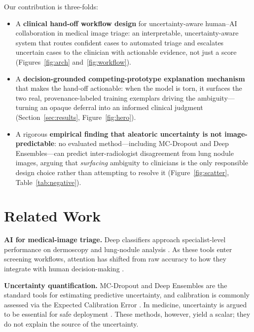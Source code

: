 \documentclass[10pt]{article}
\begin{document}
Our contribution is three-folds:
\begin{itemize}
\setlength\itemsep{0.1em}
\item A \textbf{clinical hand-off workflow design} for uncertainty-aware
human--AI collaboration in medical image triage: an interpretable,
uncertainty-aware system that routes confident cases to automated triage and
escalates uncertain cases to the clinician with actionable evidence, not just a
score (Figures~\ref{fig:arch} and~\ref{fig:workflow}).
\item A \textbf{decision-grounded competing-prototype explanation mechanism}
that makes the hand-off actionable: when the model is torn, it surfaces the two
real, provenance-labeled training exemplars driving the ambiguity---turning an
opaque deferral into an informed clinical judgment
(Section~\ref{sec:results}, Figure~\ref{fig:hero}).
\item A rigorous \textbf{empirical finding that aleatoric uncertainty is not
image-predictable}: no evaluated method---including MC-Dropout and Deep
Ensembles---can predict inter-radiologist disagreement from lung nodule images,
arguing that \emph{surfacing} ambiguity to clinicians is the only responsible
design choice rather than attempting to resolve it
(Figure~\ref{fig:scatter}, Table~\ref{tab:negative}).
\end{itemize}


\section{Related Work}

\textbf{AI for medical-image triage.} Deep classifiers approach specialist-level
performance on dermoscopy \parencite{esteva2017dermatologist,
tschandl2018ham10000} and lung-nodule analysis \parencite{armato2011lidc,
setio2017luna}. As these tools enter screening workflows, attention has shifted
from raw accuracy to how they integrate with human decision-making
\parencite{topol2019high}.

\textbf{Uncertainty quantification.} MC-Dropout \parencite{gal2016dropout} and
Deep Ensembles \parencite{lakshminarayanan2017ensembles} are the standard tools
for estimating predictive uncertainty, and calibration is commonly assessed via
the Expected Calibration Error \parencite{guo2017calibration}. In medicine,
uncertainty is argued to be essential for safe deployment
\parencite{begoli2019need, kompa2021second}. These methods, however, yield a
scalar; they do not explain the source of the uncertainty.
\end{document}
